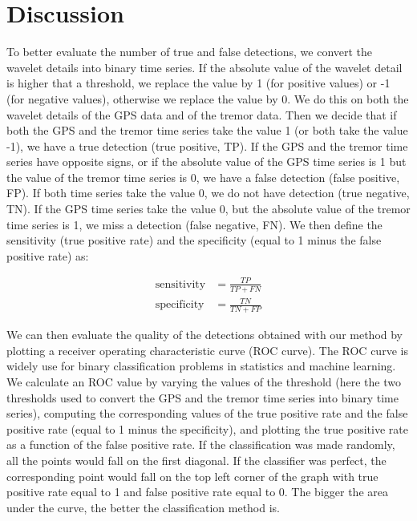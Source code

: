 \documentclass{article}
\begin{document}
\section{Discussion}

To better evaluate the number of true and false detections, we convert the wavelet details into binary time series. If the absolute value of the wavelet detail is higher that a threshold, we replace the value by 1 (for positive values) or -1 (for negative values), otherwise we replace the value by 0. We do this on both the wavelet details of the GPS data and of the tremor data. Then we decide that if both the GPS and the tremor time series take the value 1 (or both take the value -1), we have a true detection (true positive, TP). If the GPS and the tremor time series have opposite signs, or if the absolute value of the GPS time series is 1 but the value of the tremor time series is 0, we have a false detection (false positive, FP). If both time series take the value 0, we do not have detection (true negative, TN). If the GPS time series take the value 0, but the absolute value of the tremor time series is 1, we miss a detection (false negative, FN). We then define the sensitivity (true positive rate) and the specificity (equal to 1 minus the false positive rate) as:

\begin{equation}
\begin{aligned}
\text{sensitivity} &= \frac{TP}{TP + FN} \\
\text{specificity} &= \frac{TN} {TN + FP}
\end{aligned}
\end{equation}

We can then evaluate the quality of the detections obtained with our method by plotting a receiver operating characteristic curve (ROC curve). The ROC curve is widely use for binary classification problems in statistics and machine learning. We calculate an ROC value by varying the values of the threshold (here the two thresholds used to convert the GPS and the tremor time series into binary time series), computing the corresponding values of the true positive rate and the false positive rate (equal to 1 minus the specificity), and plotting the true positive rate as a function of the false positive rate. If the classification was made randomly, all the points would fall on the first diagonal. If the classifier was perfect, the corresponding point would fall on the top left corner of the graph with true positive rate equal to 1 and false positive rate equal to 0. The bigger the area under the curve, the better the classification method is. \\
\end{document}
